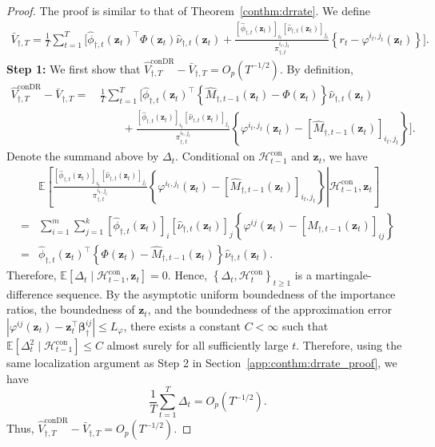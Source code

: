 \documentclass[12pt]{article}
\begin{document}
\begin{proof}
The proof is similar to that of Theorem~\ref{conthm:drrate}. 
We define 
\begin{align*} 
\bar V_{\dagger,T} = \frac{1}{T} \sum_{t=1}^T \Bigg[ \widehat{\phi}_{\dagger,t}(\bm z_t)^\top \Phi(\bm z_t) \widehat{\nu}_{\dagger,t}(\bm z_t) + \frac{ [\widehat{\phi}_{\dagger,t}(\bm z_t)]_{i_t} [\widehat{\nu}_{\dagger,t}(\bm z_t)]_{j_t} }{ \pi_{\dagger,t}^{i_t,j_t} } \left\{ r_t-\varphi^{i_t,j_t}(\bm z_t) \right\} \Bigg]. 
\end{align*} 
\textbf{Step 1:} We first show that $\widehat V_{\dagger,T}^{\mathrm{conDR}} - \bar V_{\dagger,T} = O_p(T^{-1/2})$.
By definition, 
\begin{align*} 
\widehat V_{\dagger,T}^{\mathrm{conDR}} - \bar V_{\dagger,T} =\,& \frac{1}{T} \sum_{t=1}^T \Bigg[ \widehat{\phi}_{\dagger,t}(\bm z_t)^\top \left\{ \widehat M_{\dagger,t-1}(\bm z_t) - \Phi(\bm z_t) \right\} \widehat{\nu}_{\dagger,t}(\bm z_t) \\ 
&\qquad+ \frac{ [\widehat{\phi}_{\dagger,t}(\bm z_t)]_{i_t} [\widehat{\nu}_{\dagger,t}(\bm z_t)]_{j_t} }{ \pi_{\dagger,t}^{i_t,j_t}} \left\{ \varphi^{i_t,j_t}(\bm z_t) - [\widehat M_{\dagger,t-1}(\bm z_t)]_{i_t,j_t} \right\} \Bigg]. 
\end{align*} 
Denote the summand above by $\Delta_t$. Conditional on $\mathcal H_{t-1}^{\mathrm{con}}$ and $\bm z_t$, we have 
\begin{align*} 
& \mathbb E \left[ \left. \frac{ [\widehat{\phi}_{\dagger,t}(\bm z_t)]_{i_t} [\widehat{\nu}_{\dagger,t}(\bm z_t)]_{j_t} }{ \pi_{\dagger,t}^{i_t,j_t}} \left\{ \varphi^{i_t,j_t}(\bm z_t) - [\widehat M_{\dagger,t-1}(\bm z_t)]_{i_t,j_t} \right\} \right| \mathcal H_{t-1}^{\mathrm{con}}, \bm z_t \right] \\ =& \sum_{i=1}^m \sum_{j=1}^k [\widehat{\phi}_{\dagger,t}(\bm z_t)]_i [\widehat{\nu}_{\dagger,t}(\bm z_t)]_j \left\{ \varphi^{ij}(\bm z_t) - [\widehat M_{\dagger,t-1}(\bm z_t)]_{ij} \right\} \\ =&\widehat{\phi}_{\dagger,t}(\bm z_t)^\top \left\{ \Phi(\bm z_t) - \widehat M_{\dagger,t-1}(\bm z_t) \right\} \widehat{\nu}_{\dagger,t}(\bm z_t). 
\end{align*} 
Therefore, $\mathbb E \left[ \Delta_t \mid \mathcal H_{t-1}^{\mathrm{con}}, \bm z_t \right] = 0$. Hence, $\left\{ \Delta_t, \mathcal H_t^{\mathrm{con}} \right\}_{t\ge1}$ is a martingale-difference sequence. By the asymptotic uniform boundedness of the importance ratios, the boundedness of $\bm z_t$, and the boundedness of the approximation error $\left| \varphi^{ij}(\bm z_t) - \bm z_t^\top\bm\beta_\dagger^{ij} \right| \le L_\varphi$, there exists a constant $C<\infty$ such that $\mathbb E \left[ \Delta_t^2 \mid \mathcal H_{t-1}^{\mathrm{con}} \right] \le C$ almost surely for all sufficiently large $t$. Therefore, using the same localization argument as Step 2 in Section~\ref{app:conthm:drrate_proof}, we have 
\[ \frac{1}{T} \sum_{t=1}^T \Delta_t = O_p(T^{-1/2}). \] 
Thus, $\widehat V_{\dagger,T}^{\mathrm{conDR}} - \bar V_{\dagger,T} = O_p(T^{-1/2})$.


\end{proof}
\end{document}
